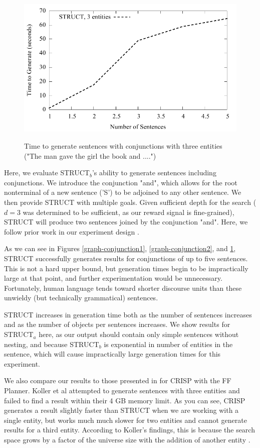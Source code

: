 \begin{figure}
\centering
\includegraphics[width=0.7 \linewidth]{../analysis/struct/conjunction/conjunction3.pdf}
\label{graph-conjunction3}
\caption{Time to generate sentences with conjunctions with three entities ("The man gave the girl the book and ....")}
\end{figure}


Here, we evaluate STRUCT$_b$'s ability to generate sentences including
conjunctions.  We introduce the conjunction "and", which allows for the
root nonterminal of a new sentence ('S') to be adjoined to any other sentence.
We then provide STRUCT with multiple goals.  Given sufficient depth for the
search ($d=3$ was determined to be sufficient, as our reward signal is fine-grained),
STRUCT will produce two sentences joined by the conjunction "and".
Here, we follow prior work in our experiment design \cite{koller_experiences_2011}.

As we can see in Figures \ref{graph-conjunction1}, \ref{graph-conjunction2}, and
\ref{graph-conjunction3}, STRUCT successfully generates results
for conjunctions of up to five sentences.  This is not a hard upper bound, but
generation times begin to be impractically large at that point, and further
experimentation would be unnecessary.  Fortunately, human language tends toward
shorter discourse units than these unwieldy (but technically grammatical) sentences.

STRUCT increases in generation time both as the number of sentences increases and as
the number of objects per sentences increases.  We show results for STRUCT$_a$ here,
as our output should contain only simple sentences without nesting, and because
STRUCT$_b$ is exponential in number of entities in the sentence, which will cause
impractically large generation times for this experiment.

We also compare our results to those presented in \cite{koller_experiences_2011} for
CRISP with the FF Planner.  Koller et al attempted to generate sentences with
three entities and failed to find a result within their 4 GB memory limit.  As you
can see, CRISP generates a result slightly faster than STRUCT when we are 
working with a single entity, but works much much slower for two entities
and cannot generate results for a third entity.  According to Koller's findings,
this is because the search space grows by a factor of the universe size with
the addition of another entity \cite{koller_experiences_2011}.

